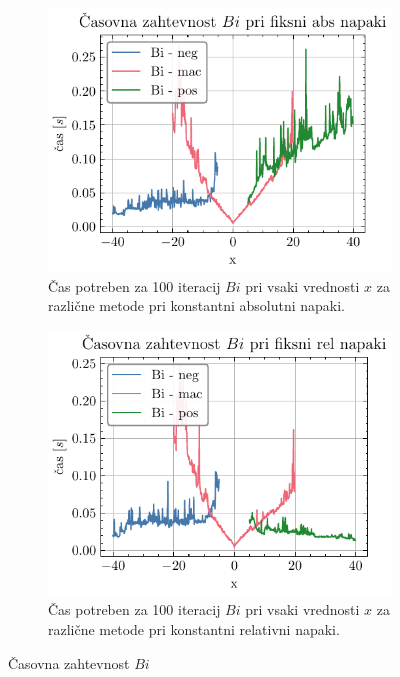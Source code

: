 \documentclass[slovene,11pt,a4paper]{article}
\begin{document}
\begin{figure}[H]
  \begin{subfigure}{0.45\textwidth}
    \centering
    \includegraphics[width=\linewidth]{graphs/cas_bi_abs.pdf}
    \caption{Čas potreben za 100 iteracij $Bi$ pri vsaki vrednosti $x$ za različne metode pri konstantni absolutni napaki.}
  \end{subfigure}\hfill
  \begin{subfigure}{0.45\textwidth}
    \centering
    \includegraphics[width=\linewidth]{graphs/cas_bi_rel.pdf}
    \caption{Čas potreben za 100 iteracij $Bi$ pri vsaki vrednosti $x$ za različne metode pri konstantni relativni napaki.}
  \end{subfigure}
  \caption{Časovna zahtevnost $Bi$}
  \label{cas bi}
\end{figure}
\end{document}
